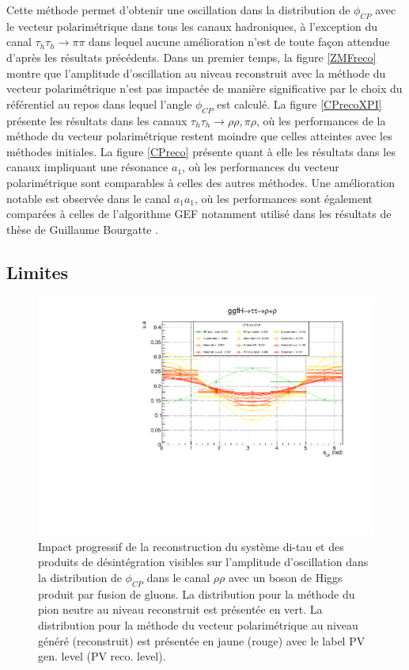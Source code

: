 Cette méthode permet d'obtenir une oscillation dans la distribution de $\phi_{CP}$ avec le vecteur polarimétrique dans tous les canaux hadroniques, à l'exception du canal $\tau_h\tau_h\rightarrow\pi\pi$ dans lequel aucune amélioration n'est de toute façon attendue d'après les résultats précédents. Dans un premier temps, la figure \ref{ZMFreco} montre que l'amplitude d'oscillation au niveau reconstruit avec la méthode du vecteur polarimétrique n'est pas impactée de manière significative par le choix du référentiel au repos dans lequel l'angle $\phi_{CP}$ est calculé. La figure \ref{CPrecoXPI} présente les résultats dans les canaux $\tau_h\tau_h\rightarrow\rho\rho,\pi\rho$, où les performances de la méthode du vecteur polarimétrique restent moindre que celles atteintes avec les méthodes initiales. La figure \ref{CPreco} présente quant à elle les résultats dans les canaux impliquant une résonance $a_1$, où les performances du vecteur polarimétrique sont comparables à celles des autres méthodes. Une amélioration notable est observée dans le canal $a_1a_1$, où les performances sont également comparées à celles de l'algorithme GEF notamment utilisé dans les résultats de thèse de Guillaume Bourgatte \cite{guigui}. \\


\subsection{Limites}


\begin{figure}[!b]
    \centering
    \includegraphics[scale=0.6]{Chapitre6/Images/genprog_evenrhorho.pdf} 
  \caption{Impact progressif de la reconstruction du système di-tau et des produits de désintégration visibles sur l'amplitude d'oscillation dans la distribution de $\phi_{CP}$ dans le canal $\rho\rho$ avec un boson de Higgs produit par fusion de gluons. La distribution pour la méthode du pion neutre au niveau reconstruit est présentée en vert. La distribution pour la méthode du vecteur polarimétrique au niveau généré (reconstruit) est présentée en jaune (rouge) avec le label PV gen. level (PV reco. level).}
  \label{smearingtaus}
\end{figure}

